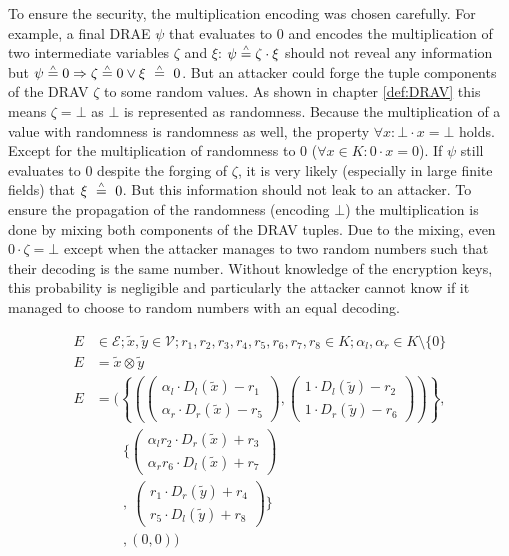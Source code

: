 To ensure the security, the multiplication encoding was chosen carefully.  For
example, a final DRAE $\psi$ that evaluates to $0$ and encodes the
multiplication of two intermediate variables $\zeta$ and $\xi$: $\psi
\stackrel{\scriptscriptstyle\wedge}{=} \zeta \cdot \xi$ should not reveal any information but $\psi
\entspricht 0 \Rightarrow \zeta \entspricht 0 \vee \xi\ \entspricht\ 0$.  But an
attacker could forge the tuple components of the DRAV $\zeta$ to some random
values. As shown in chapter \ref{def:DRAV} this means $\zeta = \bot$ as $\bot$
is represented as randomness. Because the multiplication of a value with
randomness is randomness as well, the property $\forall x: \bot \cdot x = \bot$
holds.  Except for the multiplication of randomness to $0$ ($\forall x \in K: 0
\cdot x = 0$). If $\psi$ still evaluates to $0$ despite the forging of $\zeta$,
it is very likely (especially in large finite fields) that $\xi\ \stackrel{\scriptscriptstyle\wedge}{=}\
0$. But this information should not leak to an attacker. To ensure the
propagation of the randomness (encoding $\bot$) the multiplication is done by
mixing both components of the DRAV tuples. Due to the mixing, even $0 \cdot
\zeta = \bot$ except when the attacker manages to two random numbers such that
their decoding is the same number. Without knowledge of the encryption keys,
this probability is negligible and particularly the attacker cannot know if it
managed to choose to random numbers with an equal decoding.

\begin{align*}
  E & \in \mathcal{E}; \widetilde{x}, \widetilde{y} \in \mathcal{V};
  r_1, r_2, r_3, r_4, r_5, r_6, r_7, r_8 \in K;
  \alpha_l, \alpha_r \in K \setminus \{0\} \\
  E & = \widetilde{x} \otimes \widetilde{y} \\
  E & = \Bigg(\left\{\left(
            \begin{pmatrix}
              \alpha_l \cdot D_l(\widetilde{x}) - r_1 \\
              \alpha_r \cdot D_r(\widetilde{x}) - r_5
            \end{pmatrix},
            \begin{pmatrix}
              1        \cdot D_l(\widetilde{y}) - r_2 \\
              1        \cdot D_r(\widetilde{y}) - r_6
            \end{pmatrix}
        \right)\right\}, \\
    &   \qquad\bigg\{
        \begin{pmatrix}
            \alpha_lr_2 \cdot D_r(\widetilde{x}) + r_3 \\
            \alpha_rr_6 \cdot D_l(\widetilde{x}) + r_7
          \end{pmatrix} \\
    &  \qquad,
        \ \begin{pmatrix}
            r_1        \cdot D_r(\widetilde{y}) + r_4 \\
            r_5        \cdot D_l(\widetilde{y}) + r_8
          \end{pmatrix}
        \bigg\} \\
    &  \qquad, (0, 0)
        \Bigg) \\
\end{align*}

